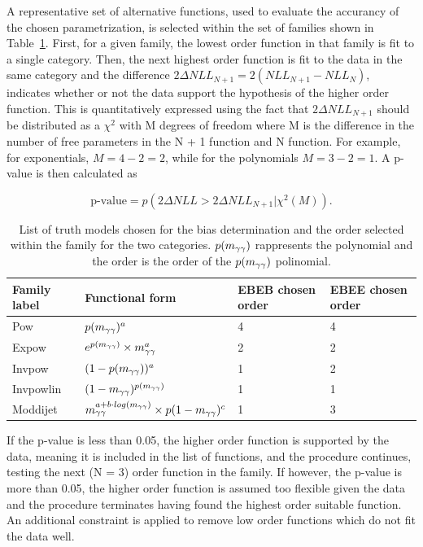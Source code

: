 A representative set of alternative functions, used to evaluate the accurancy of the chosen parametrization,
is selected within the set of families shown in Table~\ref{tab:bias_func}.
First, for a given family, the lowest order function in that family is fit to a single category. Then, the next highest order function is fit to the data in the same category and the difference $2 \Delta NLL_{N+1} = 2(NLL_{N+1} - NLL_{N})$, indicates whether or not the data support the hypothesis of the higher order function. This is quantitatively expressed using the fact that $ 2 \Delta NLL_{N+1}$ should be distributed as a $\chi^2$ with M degrees of freedom where M is the difference in the number of free parameters in the N + 1 function and N function. For example, for exponentials, $M = 4 - 2 = 2$, while for the polynomials $M = 3 - 2 = 1$. A p-value is then calculated as

$$ \text{p-value} = p(2 \Delta NLL > 2 \Delta NLL_{N+1}| \chi^2(M)). $$

\begin{table}[hbt]
\centering
\begin{tabular}{l|l||l|l}
    Family label & Functional form & EBEB chosen order & EBEE chosen order \\
    \hline
    Pow       &  $p(m_{\gamma\gamma})^a$                 &  4  &  4 \\
    Expow     &  $e^{p(m_{\gamma\gamma})}\times m_{\gamma\gamma}^a$  &  2  &  2 \\
    Invpow    &  $(1-p(m_{\gamma\gamma}))^a$             &  1  &  2 \\
    Invpowlin &  $(1-m_{\gamma\gamma})^{p(m_{\gamma\gamma})}$        &  1  &  1 \\
    Moddijet  &  $m_{\gamma\gamma}^{a+b\cdot log(m_{\gamma\gamma})} \times p(1-m_{\gamma\gamma})^c$ & 1 & 3 \\ 
\end{tabular}
\caption{
  List of truth models chosen for the bias determination and the order selected within the family for the two categories.
  $p(m_{\gamma\gamma})$ rappresents the polynomial and the order is the order of the $p(m_{\gamma\gamma})$ polinomial.
  \label{tab:bias_func}
}
\end{table}

If the p-value is less than 0.05, the higher order function is supported by the data, meaning it is included in the list of functions, and the procedure continues, testing the next (N = 3) order function in the family. If however, the p-value is more than 0.05, the higher order function is
assumed too flexible given the data and the procedure terminates having found the highest order suitable function. An additional constraint is applied to remove low order functions which do not fit the data well. %

